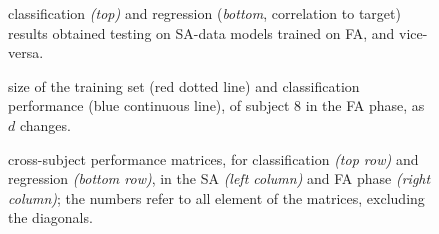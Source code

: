 \documentclass[10pt]{bmc_article}
\def\texttt{[image: ]}
\newenvironment{bmcformat}
  {\begin{raggedright}\baselineskip20pt\sloppy\setboolean{publ}{false}}
  {\end{raggedright}\baselineskip20pt\sloppy}
\begin{document}
\begin{bmcformat}
\begin{figure}[!ht] \centering
   \caption{classification \emph{(top)} and regression (\emph{bottom}, correlation to target)
      results obtained testing on SA-data models trained on FA, and vice-versa.}
  \label{fig:2on1}
\end{figure}

\begin{figure}[!ht] \centering
  \caption{size of the training set (red dotted line) and classification
    performance (blue continuous line), of subject $8$ in the FA phase, as
    $d$ changes.}
  \label{fig:subj8}
\end{figure}

\begin{figure}[!ht] \centering
  \caption{cross-subject performance matrices, for classification \emph{(top
    row)} and regression \emph{(bottom row)}, in the SA \emph{(left column)}
    and FA phase \emph{(right column)}; the numbers refer to all element of
    the matrices, excluding the diagonals.}
  \label{fig:cross}
\end{figure}

\end{bmcformat}
\end{document}
